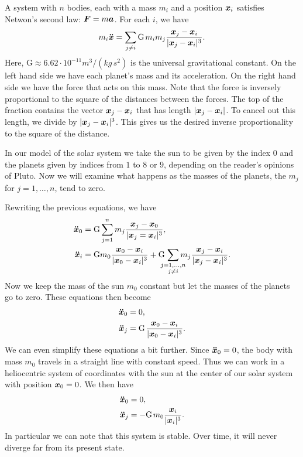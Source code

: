 \documentclass[twoside,letterpaper,10pt]{article}
\begin{document}
A system with $n$ bodies, each with a mass $m_i$ and a position $\bm{x}_i$
satisfies Netwon's second law: $\bm{F} = m \bm{a}$.
For each $i$, we have
\begin{equation*}
  m_i \bdd{x} = \sum_{j \neq i} \mathrm{G} \nobreak\hspace{.125em plus
    .14286em} m_i m_j \frac{\bp{x}_j - \bp{x}_i}{|\bp{x}_j - \bp{x}_i|^3}.
\end{equation*}
Here, $\mathrm{G} \approx 6.62 \cdot 10^{-11} m^3 / (kg\, s^2)$ is the universal
gravitational constant.
On the left hand side we have each planet's mass and its acceleration.
On the right hand side we have the force that acts on this mass.
Note that the force is inversely proportional to the square of the distances
between the forces.
The top of the fraction contains the vector $\bm{x}_j - \bm{x}_i$ that has
length $|\bm{x}_j - \bm{x}_i|$.
To cancel out this length, we divide by $|\bm{x}_j - \bm{x}_i|^3$.
This gives us the desired inverse proportionality to the square of the distance.

In our model of the solar system we take the sun to be given by the index $0$
and the planets given by indices from $1$ to $8$ or $9$, depending on the
reader's opinions of Pluto.
Now we will examine what happens as the masses of the planets, the $m_j$ for $j
= 1, \ldots, n$, tend to zero.

Rewriting the previous equations, we have
\begin{align*}
  \bdd{x}_0 &= \mathrm{G} \sum_{j = 1}^n m_j \frac{\bp{x}_j -
              \bp{x}_0}{|\bp{x}_j = \bp{x}_i|^3},\\
  \bdd{x}_i &= \mathrm{G} m_0 \frac{\bp{x}_0 - \bp{x}_i}{|\bp{x}_0 -
              \bp{x}_i|^3} + \mathrm{G} \nobreak\hspace{.125em plus
              .14286em}
              \sum_{\mathclap{\substack{j=1,\ldots,n\\j\neq i}}}
              m_j \frac{\bp{x}_j - \bp{x}_i}{|\bp{x}_j - \bp{x}_i|^3}.
\end{align*}
Now we keep the mass of the sun $m_0$ constant but let the masses of the planets
go to zero.
These equations then become
\begin{align*}
  \bdd{x}_0 &= 0,\\
  \bdd{x}_j &= \mathrm{G} \nobreak\hspace{.125em plus .14286em} \frac{\bp{x}_0 -
              \bp{x}_i}{|\bp{x}_0 - \bp{x}_i|^3}.
\end{align*}
We can even simplify these equations a bit further.
Since $\bm{\ddot{x}}_0 = 0$, the body with mass $m_0$ travels in a straight line with
constant speed.
Thus we can work in a heliocentric system of coordinates with the sun at the
center of our solar system with position $\bm{x}_0 = 0$.
We then have
\begin{align*}
  \bdd{x}_0 &= 0,\\
  \bdd{x}_j &= - \mathrm{G} \nobreak\hspace{.125em plus .14286em}
              m_0 \frac{\bp{x}_i}{|\bp{x}_i|^3}.
\end{align*}
In particular we can note that this system is stable.
Over time, it will never diverge far from its present state.
\end{document}
